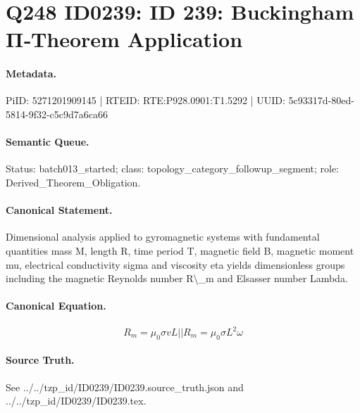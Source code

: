 \section*{Q248 ID0239: ID 239: Buckingham Π‑Theorem Application}
\paragraph{Metadata.}
PiID: 5271201909145 | RTEID: RTE:P928.0901:T1.5292 | UUID: 5c93317d-80ed-5814-9f32-c5c9d7a6ca66

\paragraph{Semantic Queue.}
Status: batch013\_started; class: topology\_category\_followup\_segment; role: Derived\_Theorem\_Obligation.

\paragraph{Canonical Statement.}
Dimensional analysis applied to gyromagnetic systems with fundamental quantities mass M, length R, time period T, magnetic field B, magnetic moment mu, electrical conductivity sigma and viscosity eta yields dimensionless groups including the magnetic Reynolds number R\textbackslash{}\_m and Elsasser number Lambda.

\paragraph{Canonical Equation.}
\[
R_m=\mu_0\sigma vL || R_m=\mu_0\sigma L^2\omega
\]

\paragraph{Source Truth.}
See ../../tzp\_id/ID0239/ID0239.source\_truth.json and ../../tzp\_id/ID0239/ID0239.tex.
